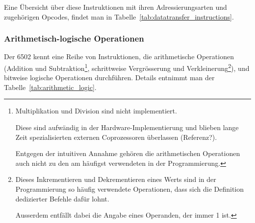 \documentclass[11pt]{scrartcl}
\begin{document}
Eine Übersicht über diese Instruktionen mit ihren Adressierungsarten
und zugehörigen Opcodes, findet man in
Tabelle~\ref{tab:datatransfer_instructions}.


\subsubsection{Arithmetisch-logische Operationen}
\label{sec:arithmetic_logic}

Der 6502 kennt eine Reihe von Instruktionen, die arithmetische
Operationen (Addition und Subtraktion\footnote{Multiplikation und
  Division sind nicht implementiert.

  Diese sind aufwändig in der Hardware-Implementierung und blieben
  lange Zeit spezialisierten externen Coprozessoren überlassen
  (Referenz?).

  Entgegen der intuitiven Annahme gehören die arithmetischen
  Operationen auch nicht zu den am häufigst verwendeten in der
  Programmierung.}, schrittweise Vergrösserung und
Verkleinerung\footnote{Dieses Inkrementieren und Dekrementieren eines
  Werts sind in der Programmierung so häufig verwendete Operationen,
  dass sich die Definition dedizierter Befehle dafür lohnt.

  Ausserdem entfällt dabei die Angabe eines Operanden, der immer 1
  ist.}),
und bitweise logische Operationen durchführen. Details
entnimmt man der Tabelle~\ref{tab:arithmetic_logic}.
\end{document}
